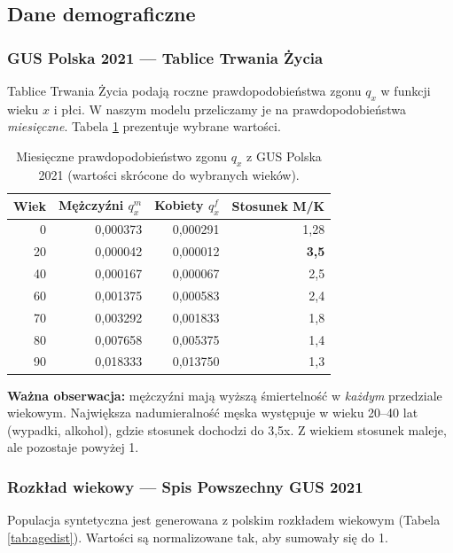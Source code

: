 \documentclass[11pt,a4paper]{article}
\begin{document}
\subsection{Dane demograficzne}

\subsubsection{GUS Polska 2021 --- Tablice Trwania Życia}

Tablice Trwania Życia podają roczne prawdopodobieństwa zgonu $q_x$ w funkcji wieku $x$ i płci. W naszym modelu przeliczamy je na prawdopodobieństwa \emph{miesięczne}. Tabela \ref{tab:mortality} prezentuje wybrane wartości.

\begin{table}[h]
\centering
\small
\begin{tabular}{rrrr}
\toprule
\textbf{Wiek} & \textbf{Mężczyźni $q_x^{m}$} & \textbf{Kobiety $q_x^{f}$} & \textbf{Stosunek M/K} \\
\midrule
0   & 0{,}000373 & 0{,}000291 & 1{,}28 \\
20  & 0{,}000042 & 0{,}000012 & \textbf{3{,}5} \\
40  & 0{,}000167 & 0{,}000067 & 2{,}5 \\
60  & 0{,}001375 & 0{,}000583 & 2{,}4 \\
70  & 0{,}003292 & 0{,}001833 & 1{,}8 \\
80  & 0{,}007658 & 0{,}005375 & 1{,}4 \\
90  & 0{,}018333 & 0{,}013750 & 1{,}3 \\
\bottomrule
\end{tabular}
\caption{Miesięczne prawdopodobieństwo zgonu $q_x$ z GUS Polska 2021 (wartości skrócone do wybranych wieków).}
\label{tab:mortality}
\end{table}

\textbf{Ważna obserwacja:} mężczyźni mają wyższą śmiertelność w \emph{każdym} przedziale wiekowym. Największa nadumieralność męska występuje w wieku 20--40 lat (wypadki, alkohol), gdzie stosunek dochodzi do 3{,}5x. Z wiekiem stosunek maleje, ale pozostaje powyżej 1.

\subsubsection{Rozkład wiekowy --- Spis Powszechny GUS 2021}

Populacja syntetyczna jest generowana z polskim rozkładem wiekowym (Tabela \ref{tab:agedist}). Wartości są normalizowane tak, aby sumowały się do 1.
\end{document}
